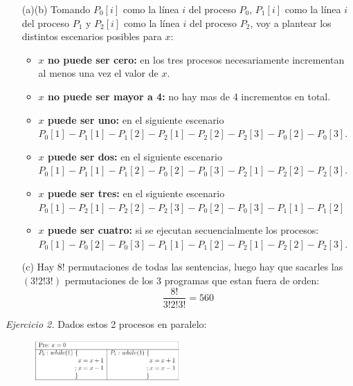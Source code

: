 \documentclass[12pt]{article}
\begin{document}
\begin{rta}
    \begin{itemize}
        \item[(a)(b)] Tomando $P_0[i]$ como la línea $i$ del proceso $P_0$, $P_1[i]$ como la línea $i$ del proceso $P_1$ y $P_2[i]$ como la línea $i$ del proceso $P_2$, voy a plantear los distintos escenarios posibles para $x$:
        \begin{itemize}
            \item \textbf{$x$ no  puede ser cero:} en los tres procesos necesariamente incrementan al menos una vez el valor de $x$.
            \item \textbf{$x$ no puede ser mayor a 4:} no hay mas de 4 incrementos en total.
            \item \textbf{$x$ puede ser uno:} en el siguiente escenario $P_0[1]-P_1[1]-P_1[2]-P_2[1]-P_2[2]-P_2[3]-P_0[2]-P_0[3]$.
            \item \textbf{$x$ puede ser dos:} en el siguiente escenario $P_0[1]-P_1[1]-P_1[2]-P_0[2]-P_0[3]-P_2[1]-P_2[2]-P_2[3]$.
            \item \textbf{$x$ puede ser tres:} en el siguiente escenario $P_0[1]-P_2[1]-P_2[2]-P_2[3]-P_0[2]-P_0[3]-P_1[1]-P_1[2]$
            \item \textbf{$x$ puede ser cuatro:} si se ejecutan secuencialmente los procesos:  $P_0[1]-P_0[2]-P_0[3]-P_1[1]-P_1[2]-P_2[1]-P_2[2]-P_2[3]$.
        \end{itemize}
        \item[(c)] Hay $8!$ permutaciones de todas las sentencias, luego hay que sacarles las $(3!2!3!)$ permutaciones de los 3 programas que estan fuera de orden:
        \begin{equation*}
            \frac{8!}{3!2!3!} = 560
        \end{equation*}
    \end{itemize}
\end{rta}

\newpage
\noindent \textit{Ejercicio 2.} Dados estos 2 procesos en paralelo:

\begin{figure}[h]
    \centering
    \includegraphics[width=0.5\textwidth]{c2.png}
\end{figure}
\end{document}
